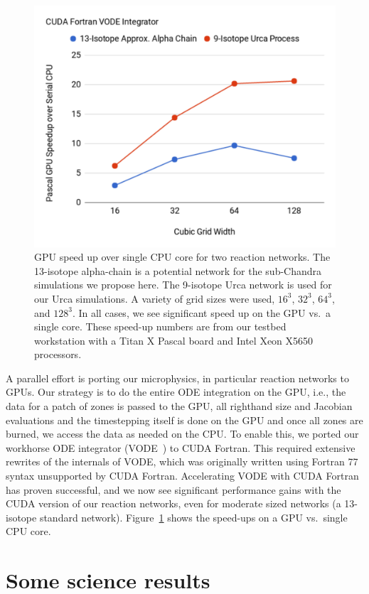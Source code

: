 \documentclass[letterpaper]{jpconf}
\begin{document}
\begin{figure}[t]
\centering
\includegraphics[width=0.48\linewidth]{CUDA-Fortran-VODE-Integrator}
\begin{minipage}[b]{0.48\linewidth}
\caption{\label{fig:cudaode} GPU speed up over single CPU core for two
  reaction networks.  The 13-isotope alpha-chain is a
  potential network for the sub-Chandra simulations we propose here.
  The 9-isotope Urca network is used for our Urca simulations.  A
  variety of grid sizes were used, $16^3$, $32^3$, $64^3$, and
  $128^3$.  In all cases, we see significant speed up on the GPU
  vs.\ a single core.  These speed-up numbers are from our testbed
  workstation with a Titan X Pascal board and Intel Xeon X5650 processors.}
\end{minipage}
\end{figure}

A parallel effort is porting our microphysics, in particular reaction
networks to GPUs.  Our strategy is to do the entire ODE integration on
the GPU, i.e., the data for a patch of zones is passed to the GPU, all
righthand size and Jacobian evaluations and the timestepping itself is
done on the GPU and once all zones are burned, we access the data as
needed on the CPU.  To enable this, we ported our workhorse ODE
integrator (VODE~\cite{vode}) to CUDA Fortran. This required extensive
rewrites of the internals of VODE, which was originally written using
Fortran 77 syntax unsupported by CUDA Fortran. Accelerating VODE with
CUDA Fortran has proven successful, and we now see significant
performance gains with the CUDA version of our reaction networks, even
for moderate sized networks (a 13-isotope standard network).
Figure~\ref{fig:cudaode} shows the speed-ups on a GPU vs.\ single CPU
core.



\section{Some science results}
\end{document}
